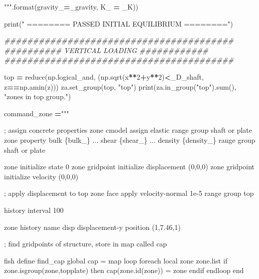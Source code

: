 \documentclass[a4paper, nobind]{templates/ociamthesis}
\newenvironment{Shaded}{\begin{snugshade}}{\end{snugshade}}
\newcommand{\BuiltInTok}[1]{#1}
\newcommand{\CommentTok}[1]{\textcolor[rgb]{0.56,0.35,0.01}{\textit{#1}}}
\newcommand{\DecValTok}[1]{\textcolor[rgb]{0.00,0.00,0.81}{#1}}
\newcommand{\NormalTok}[1]{#1}
\newcommand{\OperatorTok}[1]{\textcolor[rgb]{0.81,0.36,0.00}{\textbf{#1}}}
\newcommand{\SpecialCharTok}[1]{\textcolor[rgb]{0.00,0.00,0.00}{#1}}
\newcommand{\StringTok}[1]{\textcolor[rgb]{0.31,0.60,0.02}{#1}}
\renewenvironment{Shaded}
{
  \vspace{10pt}%
  \begin{snugshade}%
}{%
  \end{snugshade}%
  \vspace{8pt}%
}
\begin{document}
\begin{Shaded}
\begin{Highlighting}[]
\StringTok{"""}\NormalTok{.}\BuiltInTok{format}\NormalTok{(gravity\_}\OperatorTok{=}\NormalTok{\_gravity, K\_ }\OperatorTok{=}\NormalTok{ \_K))}

\BuiltInTok{print}\NormalTok{(}\StringTok{"               ======== PASSED INITIAL EQUILIBRIUM ========"}\NormalTok{)}

\CommentTok{\#\#\#\#\#\#\#\#\#\#\#\#\#\#\#\#\#\#\#\#\#\#\#\#\#\#\#\#\#\#\#\#\#\#\#\#\#\#\#\#}
\CommentTok{\#\#\#\#\#\#\#\#\#\# VERTICAL LOADING \#\#\#\#\#\#\#\#\#\#\#\#}
\CommentTok{\#\#\#\#\#\#\#\#\#\#\#\#\#\#\#\#\#\#\#\#\#\#\#\#\#\#\#\#\#\#\#\#\#\#\#\#\#\#\#\#}

\NormalTok{top }\OperatorTok{=} \BuiltInTok{reduce}\NormalTok{(np.logical\_and, (np.sqrt(x}\OperatorTok{**}\DecValTok{2}\OperatorTok{+}\NormalTok{y}\OperatorTok{**}\DecValTok{2}\NormalTok{)}\OperatorTok{\textless{}}\NormalTok{\_D\_shaft, z}\OperatorTok{==}\NormalTok{np.amin(z)))}
\NormalTok{za.set\_group(top, }\StringTok{"top"}\NormalTok{) }
\BuiltInTok{print}\NormalTok{(za.in\_group(}\StringTok{"top"}\NormalTok{).}\BuiltInTok{sum}\NormalTok{(), }\StringTok{"zones in top group."}\NormalTok{) }

\NormalTok{command\_zone }\OperatorTok{=}\StringTok{"""}

\StringTok{; assign concrete properties}
\StringTok{zone cmodel assign elastic range group \textquotesingle{}shaft\textquotesingle{} or \textquotesingle{}plate\textquotesingle{}}
\StringTok{zone property bulk }\SpecialCharTok{\{bulk\_\}}\StringTok{ ...}
\StringTok{shear }\SpecialCharTok{\{shear\_\}}\StringTok{ ...}
\StringTok{density }\SpecialCharTok{\{density\_\}}\StringTok{ range group \textquotesingle{}shaft\textquotesingle{} or \textquotesingle{}plate\textquotesingle{}}

\StringTok{zone initialize state 0}
\StringTok{zone gridpoint initialize displacement (0,0,0)}
\StringTok{zone gridpoint initialize velocity     (0,0,0) }

\StringTok{; apply displacement to top}
\StringTok{zone face apply velocity{-}normal 1e{-}5 range group \textquotesingle{}top\textquotesingle{}}

\StringTok{history interval 100}

\StringTok{zone history name \textquotesingle{}disp\textquotesingle{} displacement{-}y position (1,7.46,1)}

\StringTok{; find gridpoints of structure, store in map called cap}

\StringTok{fish define find\_cap}
\StringTok{    global cap = map}
\StringTok{    loop foreach local zone zone.list}
\StringTok{        if zone.isgroup(zone,\textquotesingle{}topplate\textquotesingle{}) then}
\StringTok{            cap(zone.id(zone)) = zone}
\StringTok{        endif}
\StringTok{    endloop}
\StringTok{end}


\end{Highlighting}
\end{Shaded}
\end{document}
